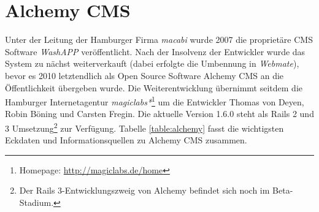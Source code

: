 \section{Alchemy CMS}
Unter der Leitung der Hamburger Firma \emph{macabi} wurde 2007 die proprietäre CMS Software \emph{WashAPP} veröffentlicht. Nach der Insolvenz der Entwickler wurde das System zu nächst weiterverkauft (dabei erfolgte die Umbennung in \emph{Webmate}), bevor es 2010 letztendlich als Open Source Software Alchemy CMS an die Öffentlichkeit übergeben wurde. Die Weiterentwicklung übernimmt seitdem die Hamburger Internetagentur \emph{magiclabs*}\footnote{Homepage: \href{http://magiclabs.de/home}{http://magiclabs.de/home}} um die Entwickler Thomas von Deyen, Robin Böning und Carsten Fregin. Die aktuelle Version 1.6.0 steht als Rails 2 und 3 Umsetzung\footnote{Der Rails 3-Entwicklungszweig von Alchemy befindet sich noch im Beta-Stadium.} zur Verfügung. Tabelle \ref{table:alchemy} fasst die wichtigsten Eckdaten und Informationsquellen zu Alchemy CMS zusammen.
